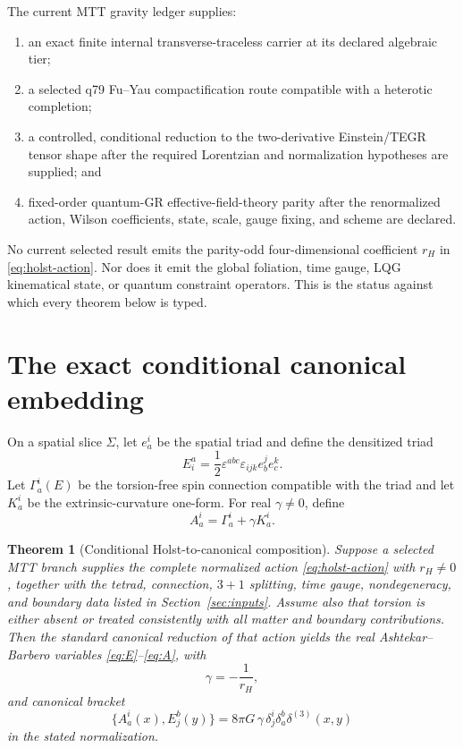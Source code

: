\documentclass[11pt]{article}
\theoremstyle{plain}
\newtheorem{theorem}{Theorem}[section]
\newcommand{\eps}{\varepsilon}
\begin{document}
The current MTT gravity ledger supplies:
\begin{enumerate}
\item an exact finite internal transverse-traceless carrier at its declared
  algebraic tier;
\item a selected q79 Fu--Yau compactification route compatible with a
  heterotic completion;
\item a controlled, conditional reduction to the two-derivative
  Einstein/TEGR tensor shape after the required Lorentzian and normalization
  hypotheses are supplied; and
\item fixed-order quantum-GR effective-field-theory parity after the
  renormalized action, Wilson coefficients, state, scale, gauge fixing, and
  scheme are declared.
\end{enumerate}

No current selected result emits the parity-odd four-dimensional coefficient
\(r_H\) in \eqref{eq:holst-action}. Nor does it emit the global foliation,
time gauge, LQG kinematical state, or quantum constraint operators. This is
the status against which every theorem below is typed.

\section{The exact conditional canonical embedding}
\label{sec:canonical}

On a spatial slice \(\Sigma\), let \(e^i_a\) be the spatial triad and define
the densitized triad
\begin{equation}
\label{eq:E}
 E^a_i=\frac12\eps^{abc}\eps_{ijk}e^j_b e^k_c.
\end{equation}
Let \(\Gamma^i_a(E)\) be the torsion-free spin connection compatible with the
triad and let \(K^i_a\) be the extrinsic-curvature one-form. For real
\(\gamma\ne0\), define
\begin{equation}
\label{eq:A}
 A^i_a=\Gamma^i_a+\gamma K^i_a .
\end{equation}

\begin{theorem}[Conditional Holst-to-canonical composition]
\label{thm:holst-canonical}
Suppose a selected MTT branch supplies the complete normalized action
\eqref{eq:holst-action} with \(r_H\ne0\), together with the tetrad,
connection, \(3+1\) splitting, time gauge, nondegeneracy, and boundary data
listed in Section~\ref{sec:inputs}. Assume also that torsion is either absent
or treated consistently with all matter and boundary contributions. Then the
standard canonical reduction of that action yields the real
Ashtekar--Barbero variables \eqref{eq:E}--\eqref{eq:A}, with
\[
 \gamma=-\frac1{r_H},
\]
and canonical bracket
\begin{equation}
\label{eq:bracket}
 \{A^i_a(x),E^b_j(y)\}
 =
 8\pi G\,\gamma\,
 \delta^i_j\delta^b_a\delta^{(3)}(x,y)
\end{equation}
in the stated normalization.
\end{theorem}
\end{document}
